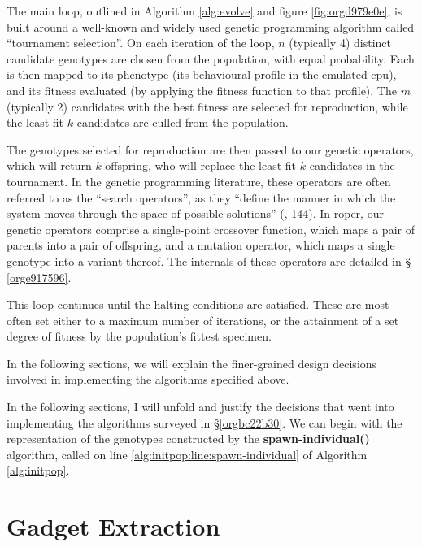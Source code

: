 \documentclass[12pt,glossary]{dalthesis}
\begin{document}
The main loop, outlined in Algorithm \ref{alg:evolve} and figure \ref{fig:orgd979e0e},
is built around a well-known and widely used genetic programming algorithm
called ``tournament selection''. On each iteration of the loop, \(n\) (typically 4)
distinct candidate genotypes are chosen from the population, with equal
probability. Each is then mapped to its phenotype (its behavioural profile in
the emulated \gls{cpu}), and its fitness evaluated (by applying the fitness
function to that profile). The \(m\) (typically 2) candidates with the best
fitness are selected for reproduction, while the least-fit \(k\) candidates are
culled from the population.

The genotypes selected for reproduction are then passed to our genetic
operators, which will return \(k\) offspring, who will replace the least-fit \(k\)
candidates in the tournament. In the genetic programming literature, these
operators are often referred to as the ``search operators'', as they ``define the
manner in which the system moves through the space of possible solutions''
(\cite{banzhaf98}, 144). In \gls{roper}, our genetic operators comprise a
single-point crossover function, which maps a pair of parents into a pair of
offspring, and a mutation operator, which maps a single genotype into a variant
thereof. The internals of these operators are detailed in \S
\ref{orge917596}.

This loop continues until the halting conditions are satisfied. These are most
often set either to a maximum number of iterations, or the attainment of a set
degree of fitness by the population's fittest specimen.

In the following sections, we will explain the finer-grained design decisions
involved in implementing the algorithms specified above. 

In the following sections, I will unfold and justify the decisions that went into
implementing the algorithms surveyed in \S \ref{orgbc22b30}.
We can begin with the representation of the genotypes constructed by
the \textbf{spawn-individual()} algorithm, called on line
\ref{alg:initpop:line:spawn-individual} of Algorithm \ref{alg:initpop}.

\section{Gadget Extraction}
\label{sec:orgbc471b2}
\label{orgcc04ae8}
\end{document}
